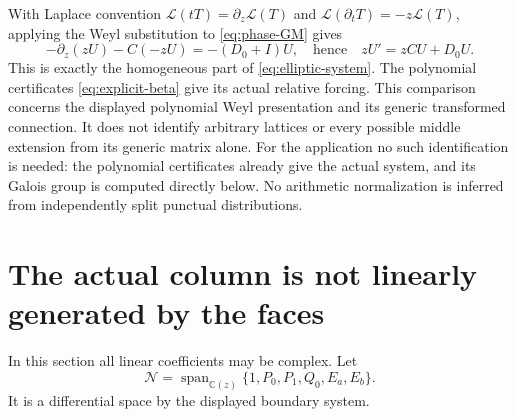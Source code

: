 \documentclass[11pt]{article}
\numberwithin{equation}{section}
\theoremstyle{definition}
\theoremstyle{remark}
\newcommand{\C}{\mathbb C}
\newcommand{\Span}{\operatorname{span}}
\newcommand{\Ncal}{\mathcal N}
\begin{document}
With Laplace convention
$\mathcal L(tT)=\partial_z\mathcal L(T)$ and
$\mathcal L(\partial_tT)=-z\mathcal L(T)$, applying the Weyl substitution
to \eqref{eq:phase-GM} gives
\[
 -\partial_z(zU)-C(-zU)=-(D_0+I)U,
 \quad\text{hence}\quad zU'=zCU+D_0U.
\]
This is exactly the homogeneous part of \eqref{eq:elliptic-system}.
The polynomial certificates \eqref{eq:explicit-beta} give its actual
relative forcing. This comparison concerns the displayed polynomial Weyl presentation
and its generic transformed connection. It does not identify arbitrary
lattices or every possible middle extension from its generic matrix alone.
For the application no such identification is needed: the polynomial
certificates already give the actual system, and its Galois group is
computed directly below. No arithmetic normalization is inferred from
independently split punctual distributions.

\section{The actual column is not linearly generated by the faces}
In this section all linear coefficients may be complex. Let
\[
 \Ncal=\Span_{\C(z)}\{1,P_0,P_1,Q_0,E_a,E_b\}.
\]
It is a differential space by the displayed boundary system.
\end{document}
